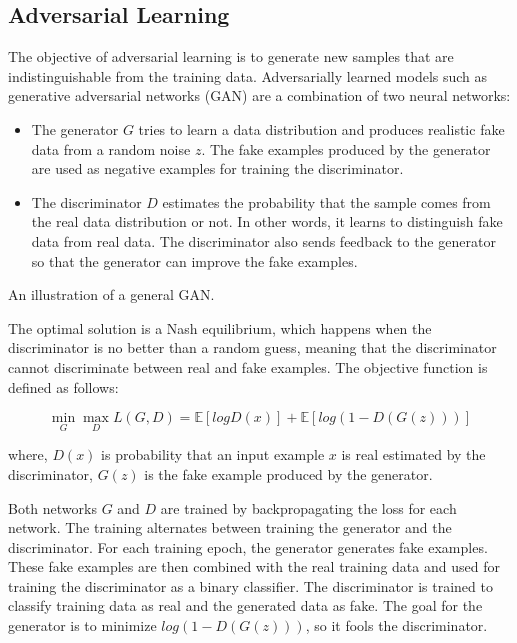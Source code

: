 \subsection{Adversarial Learning}

The objective of adversarial learning is to generate new samples that are indistinguishable from the training data.
Adversarially learned models such as generative adversarial networks (GAN) \cite{GAN_Original} are a combination of two neural networks:

\begin{itemize}
  \item The generator $G$ tries to learn a data distribution and produces realistic fake data from a random noise $z$.
        The fake examples produced by the generator are used as negative examples for training the discriminator.
  \item The discriminator $D$ estimates the probability that the sample comes from the real data distribution or not.
        In other words, it learns to distinguish fake data from real data.
        The discriminator also sends feedback to the generator so that the generator can improve the fake examples.
\end{itemize}

%
{An illustration of a general GAN.\label{ch:Background:fig:GAN_Architecture}}

The optimal solution is a Nash equilibrium, which happens when the discriminator is no better than a random guess, meaning that the discriminator cannot discriminate between real and fake examples.
The objective function is defined as follows:

\[
  \min_{G} \max_{D} L(G, D) = \mathbb{E}[logD(x)] + \mathbb{E}[log(1-D(G(z)))]
\]

where, $D(x)$ is probability that an input example $x$ is real estimated by the discriminator, $G(z)$ is the fake example produced by the generator.

Both networks $G$ and $D$ are trained by backpropagating the loss for each network.
The training alternates between training the generator and the discriminator.
For each training epoch, the generator generates fake examples.
These fake examples are then combined with the real training data and used for training the discriminator as a binary classifier.
The discriminator is trained to classify training data as real and the generated data as fake.
The goal for the generator is to minimize $log(1-D(G(z)))$, so it fools the discriminator.

